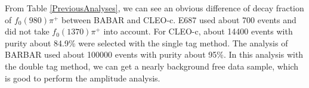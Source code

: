     From Table \ref{PreviousAnalyses}, we can see an obvious difference of decay fraction of $f_{0}(980)\pi^{+}$ between BABAR and CLEO-c. E687 used about 700 events and did not take $f_{0}(1370)\pi^{+}$ into account. For CLEO-c, about 14400 events with purity about 84.9\% were selected with the single tag method. 
    The analysis of BARBAR used about 100000 events with purity about 95\%. In this analysis with the double tag method, we can get a nearly background free data sample, which is good to perform the amplitude analysis.

